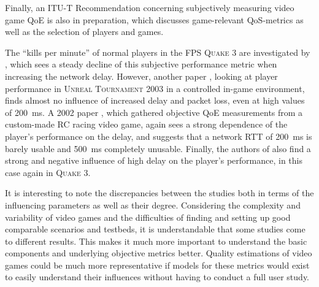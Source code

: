 Finally, an ITU-T Recommendation \cite{mollertowards} concerning subjectively measuring video game \gls{QoE} is also in preparation, which discusses game-relevant \gls{QoS}-metrics as well as the selection of players and games.


The ``kills per minute'' of normal players in the \gls{FPS} \textsc{Quake 3} are investigated by \cite{1266180}, which sees a steady decline of this subjective performance metric when increasing the network delay. However, another paper \cite{Beigbeder:2004:ELL:1016540.1016556}, looking at player performance in \textsc{Unreal Tournament 2003} in a controlled in-game environment, finds almost no influence of increased delay and packet loss, even at high values of \SI{200}{\milli\second}. %
A 2002 paper \cite{Pantel:2002:IDR:507670.507674}, which gathered objective \gls{QoE} measurements from a custom-made RC racing video game, again sees a strong dependence of the player's performance on the delay, and suggests that a network \acrshort{RTT} of \SI{200}{\milli\second} is barely usable and \SI{500}{\milli\second} completely unusable. Finally, the authors of \cite{Bredel:2010:MSR:1944796.1944797} also find a strong and negative influence of high delay on the player's performance, in this case again in \textsc{Quake 3}. 

It is interesting to note the discrepancies between the studies both in terms of the influencing parameters as well as their degree. Considering the complexity and variability of video games and the difficulties of finding and setting up good comparable scenarios and testbeds, it is understandable that some studies come to different results. This makes it much more important to understand the basic components and underlying objective metrics better. Quality estimations of video games could be much more representative if models for these metrics would exist to easily understand their influences without having to conduct a full user study.






